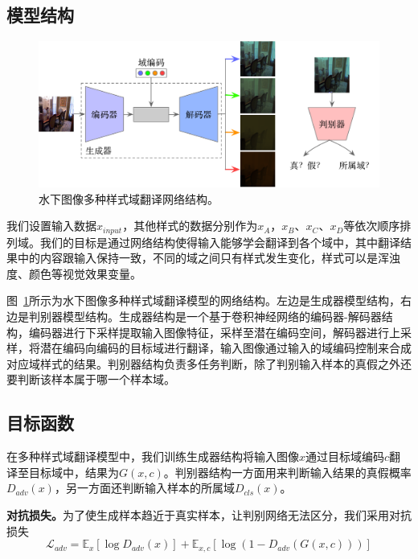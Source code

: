 \subsection{模型结构}

\begin{figure}[ht]
    \centering
    \includegraphics[width=1\textwidth]{figures/Domain_network.pdf}
    \caption{水下图像多种样式域翻译网络结构。}
    \label{fig:domain_net}
\end{figure}

我们设置输入数据$x_{input}$，其他样式的数据分别作为$x_A$，$x_B$、$x_C$、$x_D$等依次顺序排列域。我们的目标是通过网络结构使得输入能够学会翻译到各个域中，其中翻译结果中的内容跟输入保持一致，不同的域之间只有样式发生变化，样式可以是浑浊度、颜色等视觉效果变量。

图~\ref{fig:domain_net}所示为水下图像多种样式域翻译模型的网络结构。左边是生成器模型结构，右边是判别器模型结构。生成器结构是一个基于卷积神经网络的编码器-解码器结构，编码器进行下采样提取输入图像特征，采样至潜在编码空间，解码器进行上采样，将潜在编码向编码的目标域进行翻译，输入图像通过输入的域编码控制来合成对应域样式的结果。判别器结构负责多任务判断，除了判别输入样本的真假之外还要判断该样本属于哪一个样本域。

\subsection{目标函数}
在多种样式域翻译模型中，我们训练生成器结构将输入图像$x$通过目标域编码$c$翻译至目标域中，结果为$G(x,c)$。判别器结构一方面用来判断输入结果的真假概率$D_{adv}(x)$，另一方面还判断输入样本的所属域$D_{cls}(x)$。

\textbf{对抗损失。}为了使生成样本趋近于真实样本，让判别网络无法区分，我们采用对抗损失 
\begin{equation}
\label{equ:adv_exp2}
\mathcal{L}_{adv} = \mathbb{E}_x[\log D_{adv}(x)] + \mathbb{E}_{x,c}[\log(1-D_{adv}(G(x,c)))]
\end{equation}

